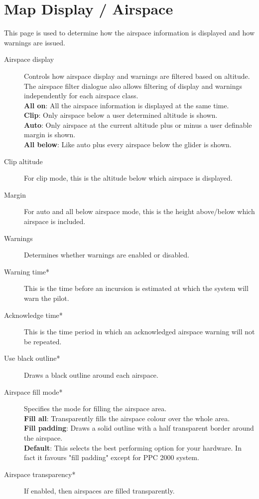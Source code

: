 \section{Map Display / Airspace}

This page is used to determine how the airspace information is
displayed and how warnings are issued.

\begin{description}
\item[Airspace display]  Controls how airspace display and warnings are filtered 
  based on altitude.  The airspace filter dialogue also allows filtering
  of display and warnings independently for each airspace class. \\
  {\bf All on}: All the airspace information is displayed at the same time. \\
  {\bf Clip}: Only airspace below a user determined altitude is shown. \\
  {\bf Auto}: Only airspace at the current altitude plus or minus a user definable margin is shown. \\
  {\bf All below}:  Like auto plus every airspace below the glider is shown.
\item[Clip altitude] For clip mode, this is the altitude below which airspace is displayed.
\item[Margin]  For auto and all below airspace mode, this is the height above/below which airspace is included.
\item[Warnings]  Determines whether warnings are enabled or disabled.
\item[Warning time*]  This is the time before an incursion is estimated at
  which the system will warn the pilot.
\item[Acknowledge time*]  This is the time period in which an acknowledged airspace 
  warning will not be repeated.
\item[Use black outline*]  Draws a black outline around each airspace.
\item[Airspace fill mode*]  Specifies the mode for filling the airspace area. \\
  {\bf Fill all}:  Transparently fills the airspace colour over the whole area. \\
  {\bf Fill padding}: Draws a solid outline with a half transparent border around the airspace. \\
  {\bf Default}:  This selects the best performing option for your hardware. In fact 
  it favours "fill padding" except for PPC 2000 system.
\item[Airspace transparency*]  If enabled, then airspaces are filled transparently.
\end{description}

